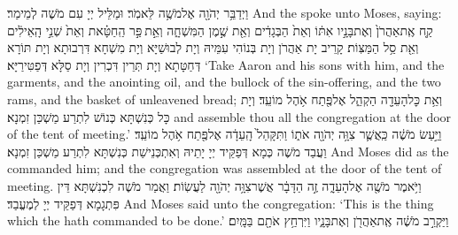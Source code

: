 \newperek
{}
{וַיְדַבֵּ֥ר יְהֹוָ֖ה אֶל\maqqaf מֹשֶׁ֥ה לֵּאמֹֽר׃}
{וּמַלֵּיל יְיָ עִם מֹשֶׁה לְמֵימַר׃}
{And the \lord\space spoke unto Moses, saying:}{}
{קַ֤ח אֶֽת\maqqaf אַהֲרֹן֙ וְאֶת\maqqaf בָּנָ֣יו אִתּ֔וֹ וְאֵת֙ הַבְּגָדִ֔ים וְאֵ֖ת שֶׁ֣מֶן הַמִּשְׁחָ֑ה וְאֵ֣ת \legarmeh  פַּ֣ר הַֽחַטָּ֗את וְאֵת֙ שְׁנֵ֣י הָֽאֵילִ֔ים וְאֵ֖ת סַ֥ל הַמַּצּֽוֹת׃}
{קָרֵיב יָת אַהֲרֹן וְיָת בְּנוֹהִי עִמֵּיהּ וְיָת לְבוּשַׁיָּא וְיָת מִשְׁחָא דִּרְבוּתָא וְיָת תּוֹרָא דְּחַטָּתָא וְיָת תְּרֵין דִּכְרִין וְיָת סַלָּא דְּפַטִּירַיָּא׃}
{‘Take Aaron and his sons with him, and the garments, and the anointing oil, and the bullock of the sin-offering, and the two rams, and the basket of unleavened bread;}{}
{וְאֵ֥ת כׇּל\maqqaf הָעֵדָ֖ה הַקְהֵ֑ל אֶל\maqqaf פֶּ֖תַח אֹ֥הֶל מוֹעֵֽד׃}
{וְיָת כָּל כְּנִשְׁתָּא כְּנוֹשׁ לִתְרַע מַשְׁכַּן זִמְנָא׃}
{and assemble thou all the congregation at the door of the tent of meeting.’}{}
{וַיַּ֣עַשׂ מֹשֶׁ֔ה כַּֽאֲשֶׁ֛ר צִוָּ֥ה יְהֹוָ֖ה אֹת֑וֹ וַתִּקָּהֵל֙ הָֽעֵדָ֔ה אֶל\maqqaf פֶּ֖תַח אֹ֥הֶל מוֹעֵֽד׃}
{וַעֲבַד מֹשֶׁה כְּמָא דְּפַקֵּיד יְיָ יָתֵיהּ וְאִתְכְּנֵישַׁת כְּנִשְׁתָּא לִתְרַע מַשְׁכַּן זִמְנָא׃}
{And Moses did as the \lord\space commanded him; and the congregation was assembled at the door of the tent of meeting.}{}
{וַיֹּ֥אמֶר מֹשֶׁ֖ה אֶל\maqqaf הָעֵדָ֑ה זֶ֣ה הַדָּבָ֔ר אֲשֶׁר\maqqaf צִוָּ֥ה יְהֹוָ֖ה לַעֲשֽׂוֹת׃}
{וַאֲמַר מֹשֶׁה לִכְנִשְׁתָּא דֵּין פִּתְגָמָא דְּפַקֵּיד יְיָ לְמֶעֱבַד׃}
{And Moses said unto the congregation: ‘This is the thing which the \lord\space hath commanded to be done.’}{}
{וַיַּקְרֵ֣ב מֹשֶׁ֔ה אֶֽת\maqqaf אַהֲרֹ֖ן וְאֶת\maqqaf בָּנָ֑יו וַיִּרְחַ֥ץ אֹתָ֖ם בַּמָּֽיִם׃}
